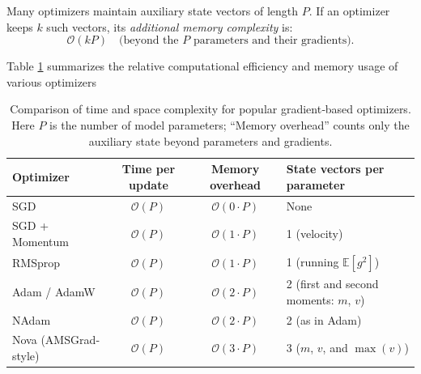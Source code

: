 \documentclass{article}
\begin{document}
Many optimizers maintain auxiliary state vectors of length $P$.  If an optimizer keeps $k$ such vectors, its \emph{additional memory complexity} is:
\[
  \mathcal{O}(kP)
  \quad\text{(beyond the $P$ parameters and their gradients).}
\]

Table \ref{tab:optimizer-complexity} summarizes the relative computational efficiency and memory usage of various optimizers

\begin{table}[H]
  \centering
  \caption{
    Comparison of time and space complexity for popular gradient‐based optimizers.
    Here $P$ is the number of model parameters; “Memory overhead” counts only the auxiliary state beyond parameters and gradients.
  }
  \begin{tabular}{@{}l c c l@{}}
    \toprule
    \textbf{Optimizer}        & \textbf{Time per update} & \textbf{Memory overhead} & \textbf{State vectors per parameter} \\
    \midrule
    SGD                       & $\mathcal O(P)$          & $\mathcal O(0\cdot P)$   & None \\
    SGD + Momentum            & $\mathcal O(P)$          & $\mathcal O(1\cdot P)$   & 1 (velocity) \\
    RMSprop                   & $\mathcal O(P)$          & $\mathcal O(1\cdot P)$   & 1 (running $\mathbb{E}[g^2]$) \\
    Adam / AdamW              & $\mathcal O(P)$          & $\mathcal O(2\cdot P)$   & 2 (first and second moments: $m$, $v$) \\
    NAdam                      & $\mathcal O(P)$          & $\mathcal O(2\cdot P)$   & 2 (as in Adam) \\
    Nova (AMSGrad‐style)      & $\mathcal O(P)$          & $\mathcal O(3\cdot P)$   & 3 ($m$, $v$, and $\max(v)$) \\
    \bottomrule
  \end{tabular}
  
  \label{tab:optimizer-complexity}
\end{table}
\end{document}
